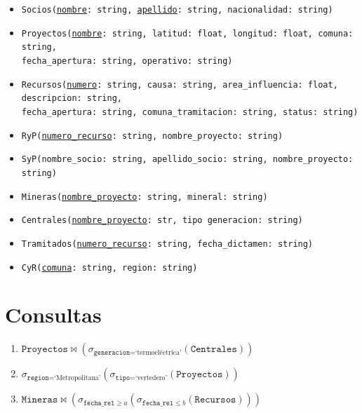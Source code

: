 \documentclass{article}
\begin{document}
	\begin{itemize}
		\item \texttt{Socios(\underline{nombre}: string, \underline{apellido}: string, nacionalidad: string)} 
		\item \texttt{Proyectos(\underline{nombre}: string, latitud: float, longitud: float, comuna: string,\\ fecha\_apertura: string, operativo: string)} 
		\item \texttt{Recursos(\underline{numero}: string, causa: string, area\_influencia: float, descripcion: string,\\ fecha\_apertura: string, comuna\_tramitacion: string, status: string)}
		\item \texttt{RyP(\underline{numero\_recurso}: string, nombre\_proyecto: string)} 
		
		\item \texttt{SyP(nombre\_socio: string, apellido\_socio: string, nombre\_proyecto: string)} 
		 
		\item \texttt{Mineras(\underline{nombre\_proyecto}: string, mineral: string)} 
		\item \texttt{Centrales(\underline{nombre\_proyecto}: str, tipo generacion: string)} 
		\item \texttt{Tramitados(\underline{numero\_recurso}: string, fecha\_dictamen: string)} 
		
		\item \texttt{CyR(\underline{comuna}: string, region: string)} 
	\end{itemize}

\section{Consultas}

\begin{enumerate}
	\item $\texttt{Proyectos} \bowtie (\sigma_{\texttt{generacion} = \text{`termoeléctrica'}}(\texttt{Centrales}))$ 
	\item $\sigma_{\texttt{region} = \text{`Metropolitana'}}(\sigma_{\texttt{tipo} = \text{`vertedero'}}(\texttt{Proyectos}))$ 
	\item $\texttt{Mineras} \bowtie (\sigma_{\texttt{fecha\_rel} \geq a}(\sigma_{\texttt{fecha\_rel} \leq b}(\texttt{Recursos})))$  
\end{enumerate}
\end{document}
